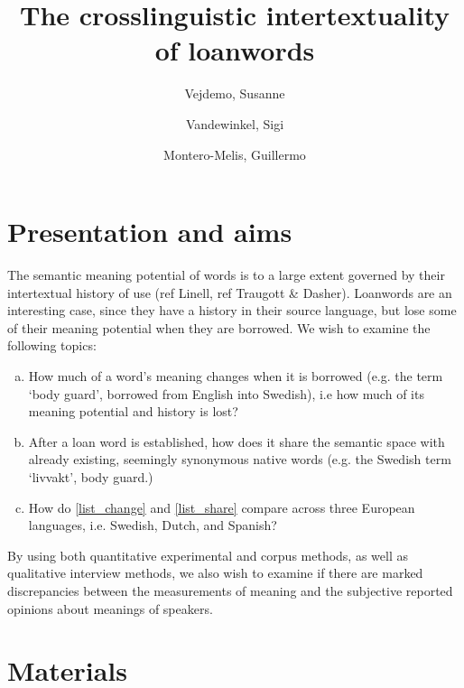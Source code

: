 \documentclass[a4paper]{article}
\title{The crosslinguistic intertextuality of loanwords}
\author{Vejdemo, Susanne \and Vandewinkel, Sigi \and Montero-Melis, Guillermo}
\begin{document}
\maketitle

\thispagestyle{fancy} %


\section{Presentation and aims} 
 
The semantic meaning potential of words is to a large extent governed by their intertextual history of use (ref Linell, ref Traugott \& Dasher).
Loanwords are an interesting case, since they have a history in their source language, but lose some of their meaning potential when they are borrowed.
We wish to examine the following topics:
%
\begin{enumerate}[a.]
	\item \label{list_change} How much of a word's meaning changes when it is borrowed (e.g. the term `body guard', borrowed from English into Swedish), i.e how much of its meaning potential and history is lost?
	\item \label{list_share} After a loan word is established, how does it share the semantic space with already existing, seemingly synonymous native words (e.g. the Swedish term `livvakt', body guard.)
	\item How do \ref{list_change} and \ref{list_share} compare across three European languages, i.e. Swedish, Dutch, and Spanish?
\end{enumerate}
%
By using both quantitative experimental and corpus methods, as well as qualitative interview methods, we also wish to examine if there are marked discrepancies between the measurements of meaning and the subjective reported opinions about meanings of speakers.





\section{Materials} 
\end{document}
